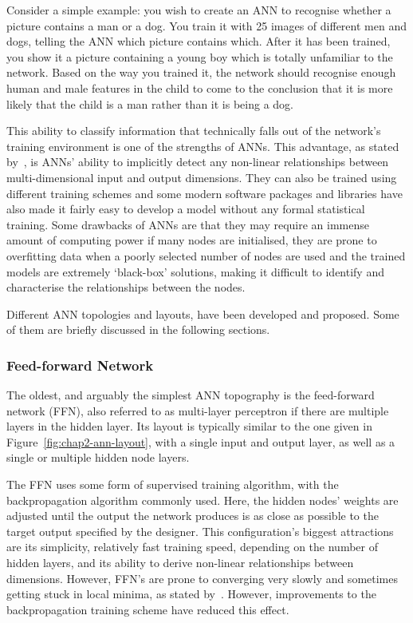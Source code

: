 Consider a simple example: you wish to create an ANN to recognise whether a picture contains a man or a dog. You train it with 25 images of different men and dogs, telling the ANN which picture contains which. After it has been trained, you show it a picture containing a young boy which is totally unfamiliar to the network. Based on the way you trained it, the network should recognise enough human and male features in the child to come to the conclusion that it is more likely that the child is a man rather than it is being a dog. 

This ability to classify information that technically falls out of the network's training environment is one of the strengths of ANNs. This advantage, as stated by~\cite{tu1996advantages}, is ANNs' ability to implicitly detect any non-linear relationships between multi-dimensional input and output dimensions. They can also be trained using different training schemes and some modern software packages and libraries have also made it fairly easy to develop a model without any formal statistical training. Some drawbacks of ANNs are that they may require an immense amount of computing power if many nodes are initialised, they are prone to overfitting data when a poorly selected number of nodes are used and the trained models are extremely `black-box' solutions, making it difficult to identify and characterise the relationships between the nodes. 

Different ANN topologies and layouts, have been developed and proposed. Some of them are briefly discussed in the following sections.

\subsubsection*{Feed-forward Network}

The oldest, and arguably the simplest ANN topography is the feed-forward network (FFN), also referred to as multi-layer perceptron if there are multiple layers in the hidden layer. Its layout is typically similar to the one given in Figure~\ref{fig:chap2-ann-layout}, with a single input and output layer, as well as a single or multiple hidden node layers. 

The FFN uses some form of supervised training algorithm, with the backpropagation algorithm commonly used. Here, the hidden nodes' weights are adjusted until the output the network produces is as close as possible to the target output specified by the designer. This configuration's biggest attractions are its simplicity, relatively fast training speed, depending on the number of hidden layers, and its ability to derive non-linear relationships between dimensions. However, FFN's are prone to converging very slowly and sometimes getting stuck in local minima, as stated by~\cite{svozil1997introduction}. However, improvements to the backpropagation training scheme have reduced this effect.


